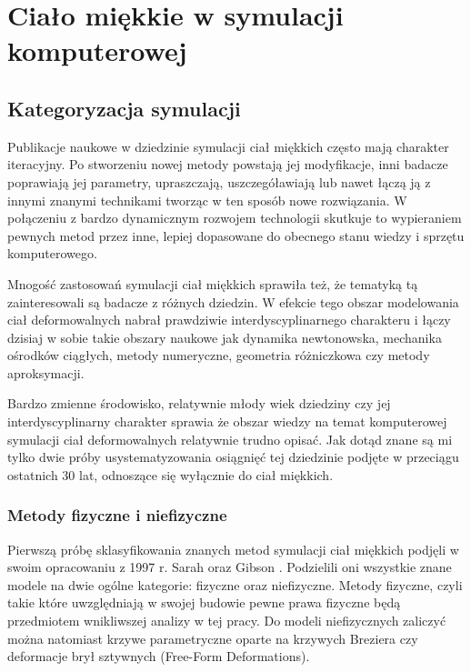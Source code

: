 \chapter{Ciało miękkie w symulacji komputerowej}

\section{Kategoryzacja symulacji}

Publikacje naukowe w dziedzinie symulacji ciał miękkich często mają charakter
iteracyjny. Po stworzeniu nowej metody powstają jej modyfikacje, inni badacze
poprawiają jej parametry, upraszczają,
uszczegóławiają lub nawet łączą ją z innymi znanymi technikami tworząc w ten
sposób nowe rozwiązania. W połączeniu z bardzo dynamicznym rozwojem technologii 
skutkuje to wypieraniem pewnych metod przez inne, lepiej dopasowane do obecnego
stanu wiedzy i sprzętu komputerowego.

Mnogość zastosowań symulacji ciał miękkich sprawiła też, że tematyką tą
zainteresowali są badacze z różnych dziedzin. W efekcie tego obszar modelowania ciał
deformowalnych nabrał prawdziwie interdyscyplinarnego charakteru i łączy dzisiaj w sobie
takie obszary naukowe jak dynamika newtonowska, mechanika ośrodków ciągłych,
metody numeryczne, geometria różniczkowa czy metody aproksymacji\cite{pbdo}.

Bardzo zmienne środowisko, relatywnie młody wiek dziedziny czy jej 
interdyscyplinarny charakter sprawia
że obszar wiedzy na temat komputerowej symulacji ciał deformowalnych relatywnie
trudno opisać.
Jak dotąd znane są mi tylko dwie próby usystematyzowania osiągnięć
tej dziedzinie podjęte w przeciągu ostatnich 30 lat, odnoszące się wyłącznie do
ciał miękkich.

\subsection{Metody fizyczne i niefizyczne}

Pierwszą próbę sklasyfikowania znanych metod symulacji ciał miękkich
podjęli w swoim opracowaniu z 1997 r. Sarah oraz Gibson \cite{TR97-19}. Podzielili
oni wszystkie znane modele na dwie ogólne kategorie: fizyczne oraz niefizyczne. Metody fizyczne, czyli
takie które uwzględniają w swojej budowie pewne prawa fizyczne będą przedmiotem
wnikliwszej analizy w tej pracy. Do modeli niefizycznych zaliczyć można natomiast
krzywe parametryczne oparte na krzywych Breziera czy deformacje brył sztywnych (Free-Form Deformations).\cite{pbdo}

